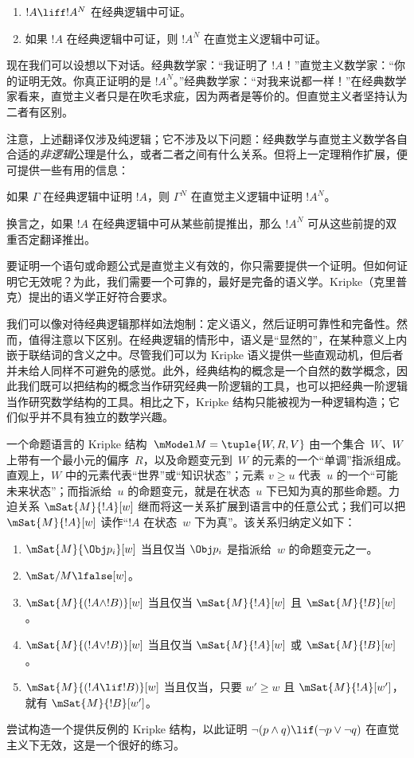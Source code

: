 \documentclass[../../../include/open-logic-section]{subfiles}
\begin{document}
\begin{thm}
\begin{enumerate}
\item $!A \liff !A^N$ 在经典逻辑中可证。
\item 如果 $!A$ 在经典逻辑中可证，则 $!A^N$ 在直觉主义逻辑中可证。
\end{enumerate}
\end{thm}

现在我们可以设想以下对话。经典数学家：“我证明了 $!A$！”直觉主义数学家：“你的证明无效。你真正证明的是 $!A^N$。”经典数学家：“对我来说都一样！”在经典数学家看来，直觉主义者只是在吹毛求疵，因为两者是等价的。但直觉主义者坚持认为二者有区别。

注意，上述翻译仅涉及纯逻辑；它不涉及以下问题：经典数学与直觉主义数学各自合适的\emph{非逻辑}公理是什么，或者二者之间有什么关系。但将上一定理稍作扩展，便可提供一些有用的信息：

\begin{thm}
如果 $\Gamma$ 在经典逻辑中证明 $!A$，则 $\Gamma^N$ 在直觉主义逻辑中证明 $!A^N$。
\end{thm}

换言之，如果 $!A$ 在经典逻辑中可从某些前提推出，那么 $!A^N$ 可从这些前提的双重否定翻译推出。

要证明一个语句或命题公式是直觉主义有效的，你只需要提供一个证明。但如何证明它无效呢？为此，我们需要一个可靠的，最好是完备的语义学。Kripke（克里普克）提出的语义学正好符合要求。

我们可以像对待经典逻辑那样如法炮制：定义语义，然后证明可靠性和完备性。然而，值得注意以下区别。在经典逻辑的情形中，语义是“显然的”，在某种意义上内嵌于联结词的含义之中。尽管我们可以为 Kripke 语义提供一些直观动机，但后者并未给人同样不可避免的感觉。此外，经典结构的概念是一个自然的数学概念，因此我们既可以把结构的概念当作研究经典一阶逻辑的工具，也可以把经典一阶逻辑当作研究数学结构的工具。相比之下，Kripke 结构只能被视为一种逻辑构造；它们似乎并不具有独立的数学兴趣。

一个命题语言的 Kripke 结构~$\mModel M = \tuple{W, R, V}$ 由一个集合~$W$、$W$ 上带有一个最小元的偏序~$R$，以及命题变元到~$W$ 的元素的一个“单调”指派组成。直观上，$W$ 中的元素代表“世界”或“知识状态”；元素 $v \geq u$ 代表~$u$ 的一个“可能未来状态”；而指派给~$u$ 的命题变元，就是在状态~$u$ 下已知为真的那些命题。力迫关系 $\mSat{M}{!A}[w]$ 继而将这一关系扩展到语言中的任意公式；我们可以把 $\mSat{M}{!A}[w]$ 读作“$!A$ 在状态~$w$ 下为真”。该关系归纳定义如下：

\begin{enumerate}
\item $\mSat{M}{\Obj p_i}[w]$ 当且仅当 $\Obj p_i$ 是指派给~$w$ 的命题变元之一。
\item $\mSat/{M}{\lfalse}[w]$。
\item $\mSat{M}{(!A \land !B)}[w]$ 当且仅当 $\mSat{M}{!A}[w]$ 且 $\mSat{M}{!B}[w]$。
\item $\mSat{M}{(!A \lor !B)}[w]$ 当且仅当 $\mSat{M}{!A}[w]$ 或 $\mSat{M}{!B}[w]$。
\item $\mSat{M}{(!A \lif !B)}[w]$ 当且仅当，只要 $w' \geq w$ 且 $\mSat{M}{!A}[w']$，就有 $\mSat{M}{!B}[w']$。
\end{enumerate}

尝试构造一个提供反例的 Kripke 结构，以此证明 $\lnot (p \land q) \lif
(\lnot p \lor \lnot q)$ 在直觉主义下无效，这是一个很好的练习。
\end{document}
